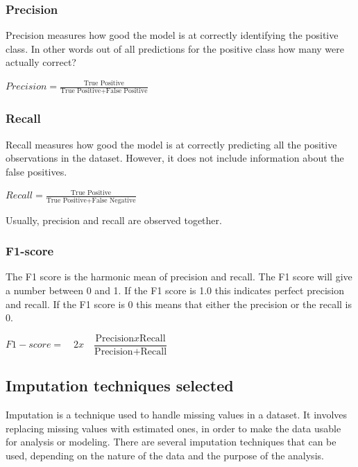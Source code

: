 \documentclass{article}
\begin{document}
\subsubsection*{Precision}
Precision measures how good the model is at correctly identifying the positive class. In other words out of all predictions for the positive class how many were actually correct?
\begin{center}
    \begin{math}
        Precision = \frac{\mbox{True Positive}}{\mbox{True Positive} + \mbox{False Positive}}
    \end{math}
\end{center}

\subsubsection*{Recall}
Recall measures how good the model is at correctly predicting all the positive observations in the dataset. However, it does not include information about the false positives. 
\begin{center}
    \begin{math}
        Recall = \frac{\mbox{True Positive}}{\mbox{True Positive} + \mbox{False Negative}}
    \end{math}
\end{center}
Usually, precision and recall are observed together. 

\subsubsection*{F1-score}
The F1 score is the harmonic mean of precision and recall. The F1 score will give a number between 0 and 1. If the F1 score is 1.0 this indicates perfect precision and recall. If the F1 score is 0 this means that either the precision or the recall is 0.
\begin{center}
    \begin{math}
        F1-score =\quad \mbox{2} x \quad\dfrac{\mbox{Precision} x \mbox{Recall}}{\mbox{Precision} + \mbox{Recall}} 
    \end{math} 
\end{center}





\subsection{Imputation techniques selected}
Imputation is a technique used to handle missing values in a dataset. It involves replacing missing values with estimated ones, in order to make the data usable for analysis or modeling. There are several imputation techniques that can be used, depending on the nature of the data and the purpose of the analysis.
\end{document}
